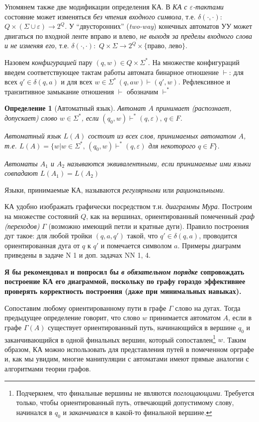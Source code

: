 \documentclass[10pt,twocolumn]{article}
\let\eps\varepsilon
\def\s{\Sigma }
\newtheorem{Definition}{Определение}
\begin{document}
{Упомянем также две модификации
определения КА. В {\em КА с  $\eps$-тактами} состояние может изменяться {\em без чтения входного символа},
т.е. $\delta(\cdot,\cdot):$ $Q \times (\s\cup\eps) \to 2^Q$.
У ``двусторонних'' ({\em two-way}) конечных автоматов УУ может двигаться по входной ленте вправо и влево, 
{\em не выходя за пределы входного слова и не изменяя его}, т.е. 
$\delta(\cdot,\cdot):$ $Q \times \s \to 2^Q\times \{\mbox{право, лево}\}$. 


Назовем {\em конфигурацией} пару $(q,w) \in Q \times \s^*$.
На множестве конфигураций введем соответствующее тактам работы
автомата бинарное отношение $\vdash$:  для всех $q'
\in \delta(q,a)$ и для всех $w \in \s^* \, (q,aw) \vdash (q',w)$.
Рефлексивное и транзитивное замыкание отношения $\vdash$ обозначим
$\vdash^*$

\begin{Definition}[Автоматный язык]
Автомат $A$ {\em принимает (рас\-по\-знает, допускает)} слово $w \in \s^*$,
если $(q_0,w) \vdash^* (q,\eps), \, q \in F$.

Автоматный язык $L(A)$ состоит из всех слов, принимаемых
автоматом $A$, т.е. $L(A) = \{w|w \in \s^*, \, (q_0,w) \vdash^*
(q,\eps)$ для неко\-то\-ро\-го $q \in F\}$.

Автоматы $A_1$ и $A_2$ называются эквивалентными, если при\-ни\-маемые ими
языки совпадают $L(A_1)=L(A_2)$
\end{Definition}

Языки, принимаемые КА, называются  \textit{регулярными}
или \textit{рациональными}.

КА удобно изображать графически посредством т.н. {\em диаграммы Мура}.
Построим на множестве состояний $Q$, как на вершинах,
ориенти\-ро\-ванный помеченный {\em граф (переходов)} $\Gamma$ (возможно
имеющий петли и кратные дуги). Правило построения дуг такое: для любой
тройки $(q,a,q')$ такой, что $q' \in \delta(q,a)$, проводится
ориентированная дуга от $q$ к $q'$ и помечается символом $a$.
Примеры диаграмм приведены в задаче N 1 и доп. задачах {NN 1, 4}.

{\large {\bf Я бы рекомендовал и попросил бы {\em в обязательном порядке} сопровождать построение КА его диаграммой,
поскольку по графу гораздо эффективнее проверять корректность построения (даже при минимальных навыках).}}


Сопоставим любому ориентированному пути в графе $\Gamma$
слово на дугах. Тогда предыдущее определение говорит, что слово $w$
принимается автоматом $A$, если в графе $\Gamma(A)$ существует
ориентированный путь, начинающийся в вершине $q_0$ и  за\-канчивающийся в
одной финальных вершин, который сопостав\-лен\footnote{Подчеркнем,
что финальные вершины не являются {\em погло\-ща\-ющими}. Требуется только,
чтобы ориентированный путь, отвеча\-ю\-щий допустимому слову, начинался в
$q_0$ и {\em заканчивался} в какой-то финальной вершине.} $w$.
Таким образом, КА можно использовать для представления путей в помеченном орграфе и, как мы увидим, многие 
манипуляции с автоматами имеют прямые аналогии с алгоритмами теории графов.

}
\end{document}
